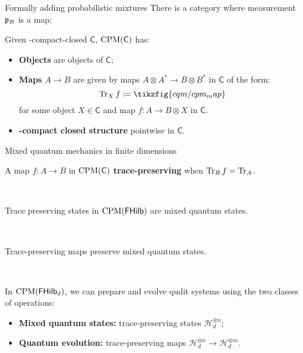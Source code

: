 \documentclass{beamer}
\begin{document}
\begin{frame}{Formally adding probabilistic mixtures}
There is a category where measurement \(\mathfrak{p}_B\) is a map:
\begin{definition}
  \label{def:cpm}
  Given \dag-compact-closed \(\mathsf{C}\),
  \(\operatorname{CPM}(\mathsf{C})\) has:
  \begin{itemize}
    \item \textbf{Objects} are objects of \(\mathsf{C}\);
    \item \textbf{Maps} \(A \to B\) are given by maps \(A\otimes A^* \to B\otimes B^*\) in \(\mathsf{C}\) of the form:
      \[\Tr_X f \coloneqq \tikzfig{cqm/cpm_map}\]
    for some object \(X \in \mathsf{C}\) and map \(f : A \to B \otimes X\) in \(\mathsf{C}\).%
    \item \textbf{\dag-compact closed structure} pointwise in \(\mathsf{C}\).
  \end{itemize}
\end{definition}
\end{frame}

\begin{frame}{Mixed quantum mechanics in finite dimensions}

A map \(f:A\to B\) in \(\operatorname{CPM}(\mathsf{C})\) \textbf{trace-preserving} when \(\Tr_B f = \Tr_A\).

\

Trace preserving states in \(\operatorname{CPM}(\mathsf{FHilb})\) are mixed quantum states. 

\

Trace-preserving maps preserve mixed quantum states.

\

 In \(\operatorname{CPM}(\mathsf{FHilb}_d)\), we can prepare and evolve qudit systems using the two classes of operations:
\begin{itemize}
  \item \textbf{Mixed quantum states:} trace-preserving states \(\mathcal{H}_d^{\otimes n}\); 
  \item \textbf{Quantum evolution:}  trace-preserving maps \(\mathcal{H}_d^{\otimes n}\to \mathcal{H}_d^{\otimes m}\).
\end{itemize}
\end{frame}
\end{document}
